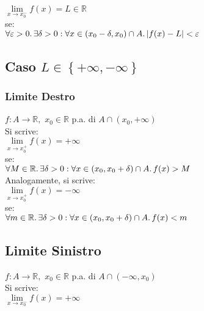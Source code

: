 \documentclass[a4paper, twoside, italian, 11pt]{book}
\newcommand{\braces}[1] {\left \{ #1 \right \}}
\newcommand{\abs}[1] {\left | #1 \right |}
\newcommand{\R}{\mathbb{R}}
\begin{document}
$\lim\limits_{x \to x_0^-} f(x) = L \in \R$ \\

\noindent
se: \\

$\forall \varepsilon > 0 \ldotp \exists \delta > 0 : \forall x \in (x_0 - \delta, x_0) \cap A \ldotp \abs{f(x) - L} < \varepsilon$


\subsection{Caso $L \in \braces{+\infty, -\infty}$}


\subsubsection{Limite Destro}

\noindent
$f : A \rightarrow \R,$ $x_0 \in \R$ p.a. di $A \cap (x_0, +\infty)$ \\

\noindent
Si scrive: \\

$\lim\limits_{x \to x_0^+} f(x) = +\infty$ \\

\noindent
se: \\

$\forall M \in \R \ldotp \exists \delta > 0 : \forall x \in (x_0, x_0 + \delta) \cap A \ldotp f(x) > M$ \\

\noindent
Analogamente, si scrive: \\

$\lim\limits_{x \to x_0^+} f(x) = -\infty$ \\

\noindent
se: \\

$\forall m \in \R \ldotp \exists \delta > 0 : \forall x \in (x_0, x_0 + \delta) \cap A \ldotp f(x) < m$


\subsection{Limite Sinistro}

\noindent
$f : A \rightarrow \R,$ $x_0 \in \R$ p.a. di $A \cap (-\infty, x_0)$ \\

\noindent
Si scrive: \\

$\lim\limits_{x \to x_0^-} f(x) = +\infty$ \\
\end{document}
